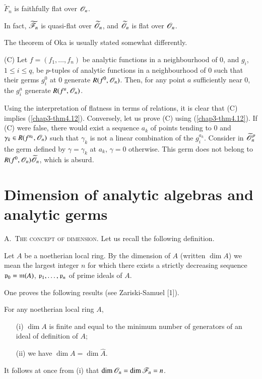 \begin{corollary}\label{chap3-coro4.13}
$\widetilde{F}_{n}$ is faithfully flat over $\mathscr{O}_{n}$.
\end{corollary}

In fact, $\widetilde{\mathscr{F}}_{n}$ is quasi-flat over $\widetilde{\mathscr{O}}_{n}$, and $\widetilde{\mathscr{O}}_{n}$ is flat over $\mathscr{O}_{n}$.

\begin{remark}\label{chap3-rem4.14}
The theorem of Oka is usually stated somewhat differently.
\end{remark}

(C) Let $f=(f_{1},\ldots,f_{n})$ be analytic functions in a neighbourhood of $0$, and $g_{i}$, $1\leq i\leq q$, be $p$-tuples of analytic functions in a neighbourhood of $0$ such that their germs $g^{0}_{i}$ at $0$ generate $R(f^{0},\mathscr{O}_{n})$. Then, for any point $a$ sufficiently near $0$, the $g^{a}_{i}$ generate $R(f^{a},\mathscr{O}_{n})$.

Using the interpretation of flatness in terms of relations, it is clear that (C) implies (\ref{chap3-thm4.12}). Conversely, let us prove (C) using (\ref{chap3-thm4.12}). If (C) were false, there would exist a sequence $a_{k}$ of points tending to $0$ and $\gamma_{k}\in R(f^{a_{k}},\mathscr{O}_{n})$ such that $\gamma_{k}$ is not a linear combination of the $g^{a_{k}}_{i}$. Consider in $\widetilde{\mathscr{O}}^{p}_{n}$ the germ defined by $\gamma=\gamma_{k}$ at $a_{k}$, $\gamma=0$ otherwise. This germ does not belong to $R(f^{0},\mathscr{O}_{n})\widetilde{\mathscr{O}}_{n}$, which is absurd.

\section{Dimension of analytic algebras and analytic germs}

A.~\textsc{The concept of dimension.} Let us recall the following definition.

\begin{definition}\label{chap3-defi5.1}
Let $A$ be a noetherian local ring. By the dimension of $A$ (written $\dim A$) we mean the largest integer $n$ for which there exists a strictly decreasing sequence $\mathfrak{p}_{0}=\mathfrak{m}(A)$, $\mathfrak{p}_{1},\ldots,\mathfrak{p}_{n}$ of prime ideals of $A$.
\end{definition}

One proves the following results (see Zariski-Samuel [1]).

\begin{proposition}\label{chap3-prop5.2}
For any noetherian local ring $A$,
\begin{itemize}
\item[(i)] $\dim A$ is finite and equal to the minimum number of generators of an ideal of definition of $A$;

\item[(ii)] we have $\dim A=\dim \widehat{A}$.
\end{itemize}

It follows at once from (i) that $\dim\mathscr{O}_{n}=\dim \mathscr{F}_{n}=n$.
\end{proposition}

